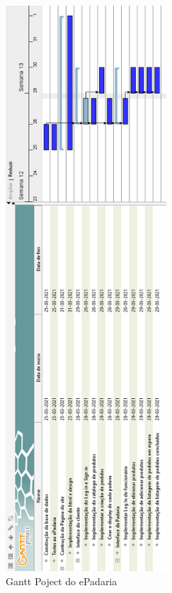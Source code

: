 \begin{figure}[H]
	\centering
	\includegraphics[width=6cm]{gantt}
	\caption{Gantt Poject do ePadaria}
	\label{fig:gantt}
\end{figure}
